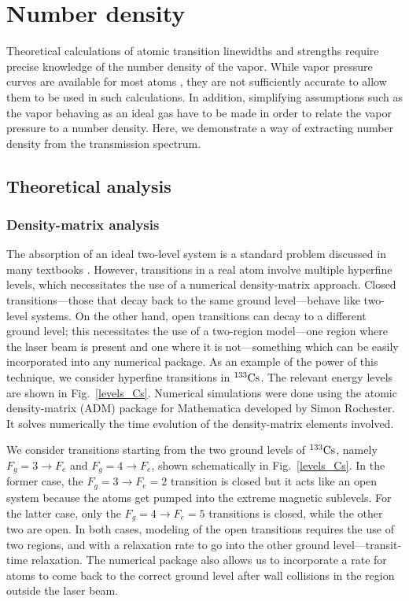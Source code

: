 \chapter{Number density}

Theoretical calculations of atomic transition linewidths  \cite{IFN09,CSB11,CHN13,CPB14} and strengths \cite{RTC98,MES99,FOO05} require precise knowledge of the number density of the vapor. While vapor pressure curves are available for most atoms \cite{STE03}, they are not sufficiently accurate to allow them to be used in such calculations. In addition, simplifying assumptions such as the vapor behaving as an ideal gas have to be made in order to relate the vapor pressure to a number density. Here, we demonstrate a way of extracting number density from the transmission spectrum.

	
\section{Theoretical analysis}
	\subsection{Density-matrix analysis}
	The absorption of an ideal two-level system is a standard problem discussed in many textbooks \cite{ALE75}. However, transitions in a real atom involve multiple hyperfine levels, which necessitates the use of a numerical density-matrix approach. Closed transitions---those that decay back to the same ground level---behave like two-level systems. On the other hand, open transitions can decay to a different ground level; this necessitates the use of a two-region model---one region where the laser beam is present and one where it is not---something which can be easily incorporated into any numerical package. As an example of the power of this technique, we consider hyperfine transitions in $\rm ^{133}Cs$. The relevant energy levels are shown in Fig.~\ref{levels_Cs}.  Numerical simulations were done using the atomic density-matrix (ADM) package for Mathematica developed by Simon Rochester. It solves numerically the time evolution of the density-matrix elements involved.
	
	We consider transitions starting from the two ground levels of $\rm ^{133}Cs$, namely $ F_g = 3 \rightarrow F_e $ and $ F_g = 4 \rightarrow F_e $, shown schematically in Fig.~\ref{levels_Cs}. In the former case, the $ F_g = 3 \rightarrow F_e = 2 $ transition is closed but it acts like an open system because the atoms get pumped into the extreme magnetic sublevels. For the latter case, only the $ F_g = 4 \rightarrow F_e = 5 $ transitions is closed, while the other two are open. In both cases, modeling of the open transitions requires the use of two regions, and with a relaxation rate to go into the other ground level---transit-time relaxation. The numerical package also allows us to incorporate a rate for atoms to come back to the correct ground level after wall collisions in the region outside the laser beam.
	
